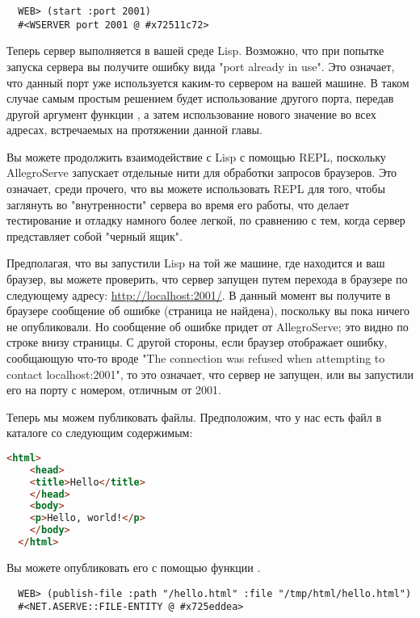\begin{lstlisting}
  WEB> (start :port 2001)
  #<WSERVER port 2001 @ #x72511c72>
\end{lstlisting}

Теперь сервер выполняется в вашей среде Lisp. Возможно, что при попытке запуска сервера вы
получите ошибку вида "port already in use". Это означает, что данный порт уже используется
каким-то сервером на вашей машине. В таком случае самым простым решением будет
использование другого порта, передав другой аргумент функции , а затем
использование нового значение во всех адресах, встречаемых на протяжении данной главы.

Вы можете продолжить взаимодействие с Lisp с помощью REPL, поскольку AllegroServe
запускает отдельные нити для обработки запросов браузеров. Это означает, среди прочего,
что вы можете использовать REPL для того, чтобы заглянуть во "внутренности" сервера во
время его работы, что делает тестирование и отладку намного более легкой, по сравнению с
тем, когда сервер представляет собой "черный ящик".

Предполагая, что вы запустили Lisp на той же машине, где находится и ваш браузер, вы
можете проверить, что сервер запущен путем перехода в браузере по следующему адресу:
\url{http://localhost:2001/}. В данный момент вы получите в браузере сообщение об ошибке
 (страница не найдена), поскольку вы пока ничего не опубликовали. Но
сообщение об ошибке придет от AllegroServe; это видно по строке внизу страницы. С другой
стороны, если браузер отображает ошибку, сообщающую что-то вроде "The connection was
refused when attempting to contact localhost:2001", то это означает, что сервер не
запущен, или вы запустили его на порту с номером, отличным от 2001.

Теперь мы можем публиковать файлы. Предположим, что у нас есть файл  в
каталоге  со следующим содержимым:

\begin{lstlisting}[language=HTML]
  <html>
    <head>
    <title>Hello</title>
    </head>
    <body>
    <p>Hello, world!</p>
    </body>
  </html>
\end{lstlisting}

Вы можете опубликовать его с помощью функции .

\begin{lstlisting}
  WEB> (publish-file :path "/hello.html" :file "/tmp/html/hello.html")
  #<NET.ASERVE::FILE-ENTITY @ #x725eddea>
\end{lstlisting}

